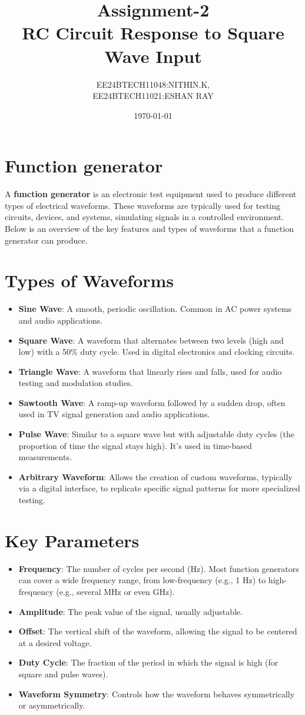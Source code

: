 \documentclass[a4paper,12pt]{article}
\title{Assignment-2\\RC Circuit Response to Square Wave Input}
\author{EE24BTECH11048:NITHIN.K,\\EE24BTECH11021:ESHAN RAY}
\date{\today}
\begin{document}
\maketitle
\section{Function generator}
A \textbf{function generator} is an electronic test equipment used to produce different types of electrical waveforms. These waveforms are typically used for testing circuits, devices, and systems, simulating signals in a controlled environment. Below is an overview of the key features and types of waveforms that a function generator can produce.

\section*{Types of Waveforms}
\begin{itemize}
    \item \textbf{Sine Wave}: A smooth, periodic oscillation. Common in AC power systems and audio applications.
    \item \textbf{Square Wave}: A waveform that alternates between two levels (high and low) with a 50\% duty cycle. Used in digital electronics and clocking circuits.
    \item \textbf{Triangle Wave}: A waveform that linearly rises and falls, used for audio testing and modulation studies.
    \item \textbf{Sawtooth Wave}: A ramp-up waveform followed by a sudden drop, often used in TV signal generation and audio applications.
    \item \textbf{Pulse Wave}: Similar to a square wave but with adjustable duty cycles (the proportion of time the signal stays high). It’s used in time-based measurements.
    \item \textbf{Arbitrary Waveform}: Allows the creation of custom waveforms, typically via a digital interface, to replicate specific signal patterns for more specialized testing.
\end{itemize}

\section*{Key Parameters}
\begin{itemize}
    \item \textbf{Frequency}: The number of cycles per second (Hz). Most function generators can cover a wide frequency range, from low-frequency (e.g., 1 Hz) to high-frequency (e.g., several MHz or even GHz).
    \item \textbf{Amplitude}: The peak value of the signal, usually adjustable.
    \item \textbf{Offset}: The vertical shift of the waveform, allowing the signal to be centered at a desired voltage.
    \item \textbf{Duty Cycle}: The fraction of the period in which the signal is high (for square and pulse waves).
    \item \textbf{Waveform Symmetry}: Controls how the waveform behaves symmetrically or asymmetrically.
\end{itemize}
\end{document}
